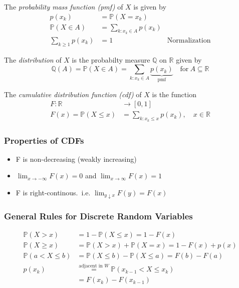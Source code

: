 The \textit{probability mass function (pmf)} of $X$ is given by
\noindent\begin{align*}
    p(x_{k})            & =\mathbb{P}(X=x_{k})                            \\
    \mathbb{P}(X\in A)  & =\sum_{k:x_k\in A}p(x_k)                        \\
    \sum_{k\geq1}p(x_k) & =1                       & \text{Normalization}
\end{align*}

\newpar{}

The \textit{distribution} of $X$ is the probabilty measure $\mathbb{Q}$ on $\mathbb{R}$ given by
\noindent\begin{equation*}
    \mathbb{Q}(A)=\mathbb{P}(X\in A)=\sum_{k:x_k\in A} \underbrace{p(x_k)}_{\text{pmf}}\quad\mathrm{for~}A\subseteq\mathbb{R}
\end{equation*}

\newpar{}

The \textit{cumulative distribution function (cdf)} of $X$ is the function
\noindent\begin{align*}
    F:\mathbb{R}            & \rightarrow [0,1]                             \\
    F(x)=\mathbb P(X\leq x) & =\sum_{k:x_k\leq x}p(x_k),\quad x\in\mathbb R
\end{align*}

\subsubsection{Properties of CDFs}
\begin{itemize}
    \item F is non-decreasing (weakly increasing)
    \item $\lim_{x\rightarrow -\infty}F(x)=0$ and $\lim_{x\rightarrow \infty}F(x)=1$
    \item F is right-continous.\ i.e. $\lim_{y\downarrow x} F(y) =F(x)$
\end{itemize}

\subsubsection{General Rules for Discrete Random Variables}
\noindent\begin{align*}
    \mathbb{P}(X>x)       & =1-\mathbb{P}(X\leq x)=1-F(x)                                   \\
    \mathbb{P}(X\geq x)   & =\mathbb{P}(X>x)+\mathbb{P}(X=x)=1-F(x)+p(x)                    \\
    \mathbb{P}(a<X\leq b) & =\mathbb{P}(X\leq b)-\mathbb{P}(X\leq a)=F(b)-F(a)              \\
    p(x_k)                & \overset{\text{adjacent in } W}{=}\mathbb{P}(x_{k-1}<X\leq x_k) \\
                          & =F(x_k)-F(x_{k-1})
\end{align*}

